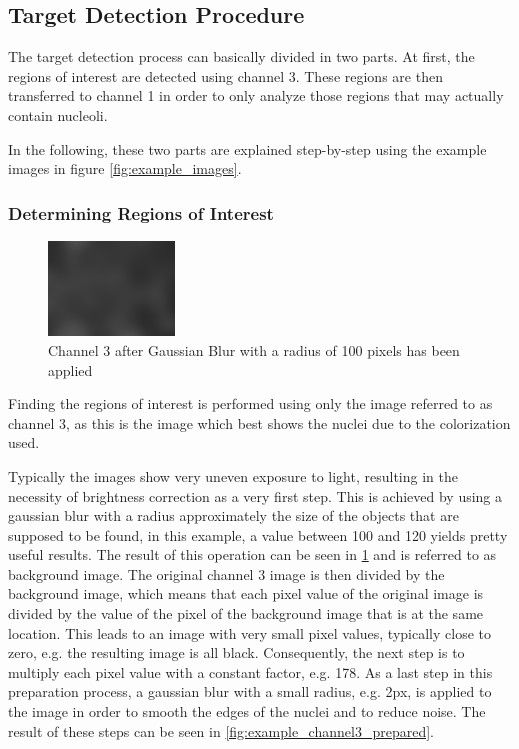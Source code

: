 \documentclass[a4paper, 12pt, twoside]{article}
\begin{document}
\subsection{Target Detection Procedure}
The target detection process can basically divided in two parts. At first, the
regions of interest are detected using channel 3. These regions are then
transferred to channel 1 in order to only analyze those regions that may
actually contain nucleoli.

In the following, these two parts are explained step-by-step using the example
images in figure \ref{fig:example_images}.


\subsubsection{Determining Regions of Interest}

\begin{figure}
\vspace{-14pt}
\includegraphics[width=0.3\textwidth]{images/example_Kanal3_gaussian100}
\caption{Channel 3 after Gaussian Blur with a radius of 100 pixels has been
applied}
\label{fig:example_channel3_gaussian}
\vspace{-28pt}
\end{figure}
Finding the regions of interest is performed using only the image referred to as
channel 3, as this is the image which best shows the nuclei due to the
colorization used.

Typically the images show very uneven exposure to light, resulting in the
necessity of brightness correction as a very first step. This is achieved by
using a gaussian blur with a radius approximately the size of the objects that
are supposed to be found, in this example, a value between 100 and 120 yields
pretty useful results. The result of this operation can be seen in
\ref{fig:example_channel3_gaussian} and is referred to as background image. The
original channel 3 image is then divided by the background image, which means
that each pixel value of the original image is divided by the value of the pixel
of the background image that is at the same location. 
This leads to an image with very small pixel values, typically close to zero,
e.g. the resulting image is all black. Consequently, the next step is to
multiply each pixel value with a constant factor, e.g. 178. As a last step in
this preparation process, a gaussian blur with a small radius, e.g. 2px, is
applied to the image in order to smooth the edges of the nuclei and to reduce
noise. The result of these steps can be seen in \ref{fig:example_channel3_prepared}.
\end{document}
